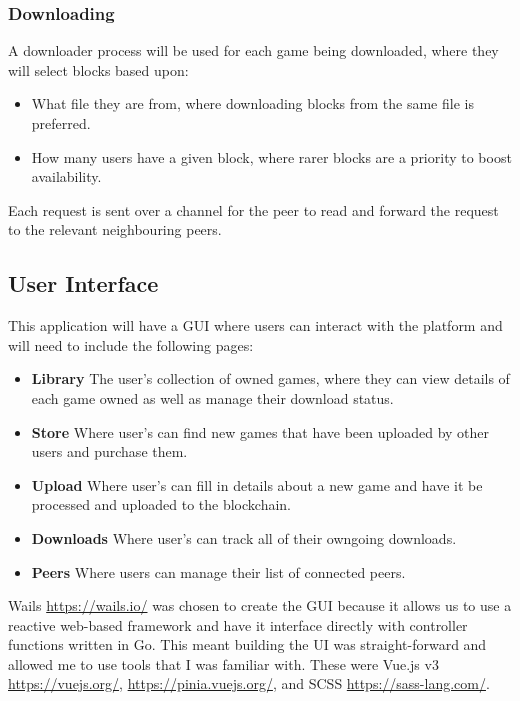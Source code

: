 \subsubsection*{Downloading}

A downloader process will be used for each game being downloaded, where they will select blocks based upon:

\begin{itemize}
  \item What file they are from, where downloading blocks from the same file is preferred.
  \item How many users have a given block, where rarer blocks are a priority to boost availability.
\end{itemize}

\vspace{2mm}\noindent
Each request is sent over a channel for the peer to read and forward the request to the relevant neighbouring peers.

\subsection{User Interface}

This application will have a GUI where users can interact with the platform and will need to include the following pages:

\begin{itemize}
  \item \textbf{Library} The user's collection of owned games, where they can view details of each game owned as well as manage their download status.
  \item \textbf{Store} Where user's can find new games that have been uploaded by other users and purchase them.
  \item \textbf{Upload} Where user's can fill in details about a new game and have it be processed and uploaded to the blockchain.
  \item \textbf{Downloads} Where user's can track all of their owngoing downloads.
  \item \textbf{Peers} Where users can manage their list of connected peers.
\end{itemize}

\vspace{2mm}\noindent
Wails \url{https://wails.io/} was chosen to create the GUI because it allows us to use a reactive web-based framework and have it interface directly with controller functions written in Go. This meant building the UI was straight-forward and allowed me to use tools that I was familiar with. These were Vue.js v3 \url{https://vuejs.org/}, \url{https://pinia.vuejs.org/}, and SCSS \url{https://sass-lang.com/}.


